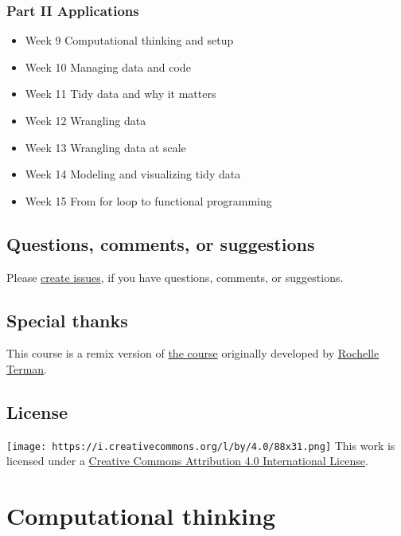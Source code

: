 \documentclass[
]{book}
\providecommand{\tightlist}{%
  \setlength{\itemsep}{0pt}\setlength{\parskip}{0pt}}
\begin{document}
\hypertarget{part-ii-applications-1}{%
\subsection{Part II Applications}\label{part-ii-applications-1}}

\begin{itemize}
\tightlist
\item
  Week 9 Computational thinking and setup
\item
  Week 10 Managing data and code
\item
  Week 11 Tidy data and why it matters
\item
  Week 12 Wrangling data
\item
  Week 13 Wrangling data at scale
\item
  Week 14 Modeling and visualizing tidy data
\item
  Week 15 From for loop to functional programming
\end{itemize}

\hypertarget{questions-comments-or-suggestions}{%
\section{Questions, comments, or suggestions}\label{questions-comments-or-suggestions}}

Please \href{https://github.com/jaeyk/PS239T/issues}{create issues}, if you have questions, comments, or suggestions.

\hypertarget{special-thanks}{%
\section{Special thanks}\label{special-thanks}}

This course is a remix version of \href{https://github.com/rochelleterman/PS239T}{the course} originally developed by \href{https://github.com/rochelleterman}{Rochelle Terman}.

\hypertarget{license}{%
\section{License}\label{license}}

\texttt{[image: https://i.creativecommons.org/l/by/4.0/88x31.png]} This work is licensed under a \href{https://creativecommons.org/licenses/by/4.0/}{Creative Commons Attribution 4.0 International License}.

\hypertarget{motivation}{%
\chapter{Computational thinking}\label{motivation}}
\end{document}
